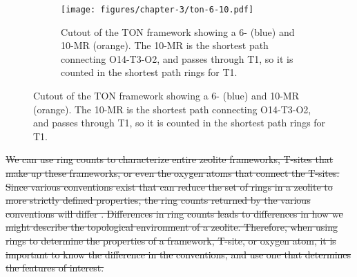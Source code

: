 \documentclass[preprint,numrefs,noinfo,sort&compress]{elsarticle}
\providecommand{\DIFdel}[1]{{\protect\color{red}\sout{#1}}}                      %
\providecommand{\DIFaddend}{} %
\providecommand{\DIFdelbegin}{} %
\providecommand{\DIFaddbeginFL}{} %
\providecommand{\DIFaddendFL}{} %
\providecommand{\DIFdelbeginFL}{} %
\providecommand{\DIFdelendFL}{} %
\newcommand{\DIFscaledelfig}{0.5}
\newlength{\DIFdelgraphicswidth} %
\newlength{\DIFdelgraphicsheight} %
\newcommand{\DIFaddincludegraphics}[2][]{{\color{blue}\fbox{\DIFOincludegraphics[#1]{#2}}}} %
\newcommand{\DIFdelincludegraphics}[2][]{%
\sbox{\DIFdelgraphicsbox}{\DIFOincludegraphics[#1]{#2}}%
\settoboxwidth{\DIFdelgraphicswidth}{\DIFdelgraphicsbox} %
\settoboxtotalheight{\DIFdelgraphicsheight}{\DIFdelgraphicsbox} %
\scalebox{\DIFscaledelfig}{%
\parbox[b]{\DIFdelgraphicswidth}{\usebox{\DIFdelgraphicsbox}\\[-\baselineskip] \rule{\DIFdelgraphicswidth}{0em}}\llap{\resizebox{\DIFdelgraphicswidth}{\DIFdelgraphicsheight}{%
\setlength{\unitlength}{\DIFdelgraphicswidth}%
\begin{picture}(1,1)%
\thicklines\linethickness{2pt} %
{\color[rgb]{1,0,0}\put(0,0){\framebox(1,1){}}}%
{\color[rgb]{1,0,0}\put(0,0){\line( 1,1){1}}}%
{\color[rgb]{1,0,0}\put(0,1){\line(1,-1){1}}}%
\end{picture}%
}\hspace*{3pt}}} %
} %
\DeclareRobustCommand{\DIFaddend}{\DIFOaddend \let\includegraphics\DIFOincludegraphics} %
\DeclareRobustCommand{\DIFdelbegin}{\DIFOdelbegin \let\includegraphics\DIFdelincludegraphics} %
\DeclareRobustCommand{\DIFaddbeginFL}{\DIFOaddbeginFL \let\includegraphics\DIFaddincludegraphics} %
\DeclareRobustCommand{\DIFaddendFL}{\DIFOaddendFL \let\includegraphics\DIFOincludegraphics} %
\DeclareRobustCommand{\DIFdelbeginFL}{\DIFOdelbeginFL \let\includegraphics\DIFdelincludegraphics} %
\DeclareRobustCommand{\DIFdelendFL}{\DIFOaddendFL \let\includegraphics\DIFOincludegraphics} %
\begin{document}
\DIFaddend \begin{figure}
\begin{figure}[H]
\centering
\DIFdelbeginFL %
\DIFdelendFL \DIFaddbeginFL \texttt{[image: figures/chapter-3/ton-6-10.pdf]}
\DIFaddendFL \caption{Cutout of the TON framework showing a 6- (blue) and 10-MR (orange). The 10-MR is the shortest path connecting O14-T3-O2, and passes through T1, so it is counted in the shortest path rings for T1. \label{fig:3.4}}
\end{figure}
\end{figure}


\DIFdelbegin \DIFdel{We can use ring counts to characterize entire zeolite frameworks, T-sites that make up these frameworks, or even the oxygen atoms that connect the T-sites. Since various conventions exist that can reduce the set of rings in a zeolite to more strictly defined properties, the ring counts returned by the various conventions will differ . Differences in ring counts leads to differences in how we might describe the topological environment of a zeolite. Therefore, when using rings to determine the properties of a framework, T-site, or oxygen atom, it is important to know the difference in the conventions, and use one that determines the features of interest. }%
\end{document}
